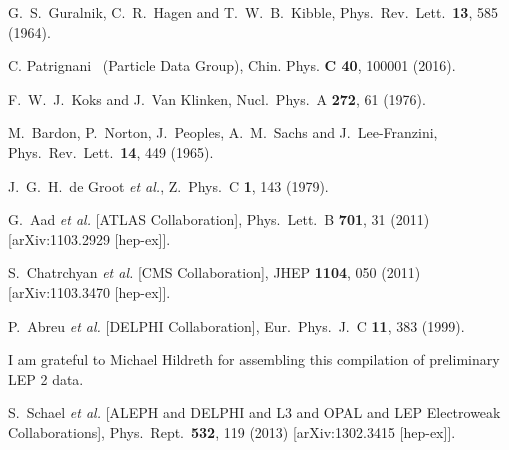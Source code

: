 \documentclass[12pt]{article}
\begin{document}
\begin{thebibliography}{99}
  G.~S.~Guralnik, C.~R.~Hagen and T.~W.~B.~Kibble,
  Phys.\ Rev.\ Lett.\  {\bf 13}, 585 (1964).

C. Patrignani \etal \ (Particle Data Group), Chin. Phys. {\bf C 40}, 100001 (2016).

 F.~W.~J.~Koks and J.~Van Klinken,
  Nucl.\ Phys.\ A {\bf 272}, 61 (1976).
 

 M.~Bardon, P.~Norton, J.~Peoples, A.~M.~Sachs and J.~Lee-Franzini,
  Phys.\ Rev.\ Lett.\  {\bf 14}, 449 (1965).


 J.~G.~H.~de Groot {\it et al.},
  Z.\ Phys.\ C {\bf 1}, 143 (1979).


 G.~Aad {\it et al.} [ATLAS Collaboration],
  Phys.\ Lett.\ B {\bf 701}, 31 (2011)
  [arXiv:1103.2929 [hep-ex]].


 S.~Chatrchyan {\it et al.} [CMS Collaboration],
  JHEP {\bf 1104}, 050 (2011)
  [arXiv:1103.3470 [hep-ex]].

  P.~Abreu {\it et al.} [DELPHI Collaboration],
  Eur.\ Phys.\ J.\ C {\bf 11}, 383 (1999).

I am grateful to Michael Hildreth for assembling this compilation of
preliminary LEP 2 data.

 S.~Schael {\it et al.} [ALEPH and DELPHI and L3 and OPAL and LEP Electroweak Collaborations],
  Phys.\ Rept.\  {\bf 532}, 119 (2013)
  [arXiv:1302.3415 [hep-ex]].


\end{thebibliography}
\end{document}
